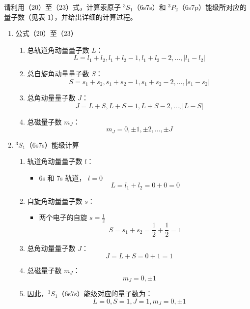 \documentclass[dvipsnames, svgnames,a4paper,11pt]{article}
\begin{document}
	
	\begin{question}
		请利用（20）至（23）式，计算汞原子 $^3S_1$（6s7s）和 $^3P_2$（6s7p）能级所对应的量子数（见表 1），并给出详细的计算过程。
	\end{question}
	\begin{enumerate}
		\item 公式（20）至（23）
		\begin{enumerate}
			\item 总轨道角动量量子数 \( L \)：
			\[
			L = l_1 + l_2, l_1 + l_2 - 1, l_1 + l_2 - 2, \ldots, |l_1 - l_2|
			\]
			
			\item 总自旋角动量量子数 \( S \)：
			\[
			S = s_1 + s_2, s_1 + s_2 - 1, s_1 + s_2 - 2, \ldots, |s_1 - s_2|
			\]
			
			\item 总角动量量子数 \( J \)：
			\[
			J = L + S, L + S - 1, L + S - 2, \ldots, |L - S|
			\]
			
			\item 总磁量子数 \( m_J \)：
			\[
			m_J = 0, \pm 1, \pm 2, \ldots, \pm J
			\]
		\end{enumerate}
		
		\item \( ^3S_1 \)（6s7s）能级计算
		\begin{enumerate}
			\item 轨道角动量量子数 \( l \)：
			\begin{itemize}
				\item 6s 和 7s 轨道， \( l = 0 \)
				\[
				L = l_1 + l_2 = 0 + 0 = 0
				\]
			\end{itemize}
			
			\item 自旋角动量量子数 \( s \)：
			\begin{itemize}
				\item 两个电子的自旋 \( s = \frac{1}{2} \)
				\[
				S = s_1 + s_2 = \frac{1}{2} + \frac{1}{2} = 1
				\]
			\end{itemize}
			
			\item 总角动量量子数 \( J \)：
			\[
			J = L + S = 0 + 1 = 1
			\]
			
			\item 总磁量子数 \( m_J \)：
			\[
			m_J = 0, \pm 1
			\]
			
			\item 因此，\( ^3S_1 \)（6s7s）能级对应的量子数为：
			\[
			L = 0, S = 1, J = 1, m_J = 0, \pm 1
			\]
		\end{enumerate}
		

\end{enumerate}
\end{document}
